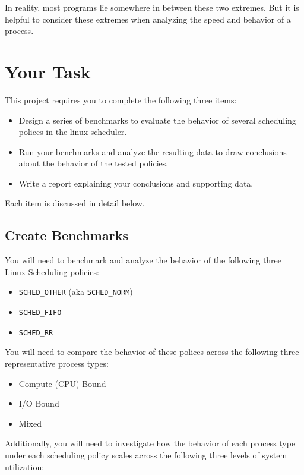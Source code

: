 \documentclass[12pt]{article}
\begin{document}
In reality, most programs lie somewhere in between these two
extremes. But it is helpful to consider these extremes when analyzing
the speed and behavior of a process.

\section{Your Task}

This project requires you to complete the following three items:

\begin{itemize}
\item Design a series of benchmarks to evaluate the behavior of
  several scheduling polices in the linux scheduler.
\item Run your benchmarks and analyze the resulting data to draw
  conclusions about the behavior of the tested policies. 
\item Write a report explaining your conclusions and supporting data.
\end{itemize}

Each item is discussed in detail below.

\subsection{Create Benchmarks}

You will need to benchmark and analyze the behavior of the following
three Linux Scheduling policies:

\begin{itemize}
\item \texttt{SCHED\_OTHER} (aka \texttt{SCHED\_NORM})
\item \texttt{SCHED\_FIFO}
\item \texttt{SCHED\_RR}
\end{itemize}

You will need to compare the behavior of these polices across the
following three representative process types:

\begin{itemize}
\item Compute (CPU) Bound
\item I/O Bound
\item Mixed
\end{itemize}

Additionally, you will need to investigate how the behavior of each
process type under each scheduling policy scales across the following
three levels of system utilization:
\end{document}

